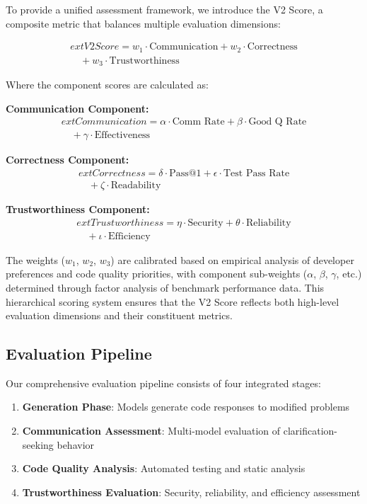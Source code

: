 \documentclass[conference]{IEEEtran}
\begin{document}
To provide a unified assessment framework, we introduce the V2 Score, a composite metric that balances multiple evaluation dimensions:

\begin{multline}
        ext{V2 Score} = w_1 \cdot \text{Communication} + w_2 \cdot \text{Correctness} \\
\quad + w_3 \cdot \text{Trustworthiness}
\end{multline}

Where the component scores are calculated as:

\textbf{Communication Component:}
\begin{multline}
        ext{Communication} = \alpha \cdot \text{Comm Rate} + \beta \cdot \text{Good Q Rate} \\
\quad + \gamma \cdot \text{Effectiveness}
\end{multline}

\textbf{Correctness Component:}
\begin{multline}
        ext{Correctness} = \delta \cdot \text{Pass@1} + \epsilon \cdot \text{Test Pass Rate} \\
\quad + \zeta \cdot \text{Readability}
\end{multline}

\textbf{Trustworthiness Component:}
\begin{multline}
        ext{Trustworthiness} = \eta \cdot \text{Security} + \theta \cdot \text{Reliability} \\
\quad + \iota \cdot \text{Efficiency}
\end{multline}

The weights ($w_1$, $w_2$, $w_3$) are calibrated based on empirical analysis of developer preferences and code quality priorities, with component sub-weights ($\alpha$, $\beta$, $\gamma$, etc.) determined through factor analysis of benchmark performance data. This hierarchical scoring system ensures that the V2 Score reflects both high-level evaluation dimensions and their constituent metrics.

\subsection{Evaluation Pipeline}

Our comprehensive evaluation pipeline consists of four integrated stages:

\begin{enumerate}
    \item \textbf{Generation Phase}: Models generate code responses to modified problems
    \item \textbf{Communication Assessment}: Multi-model evaluation of clarification-seeking behavior
    \item \textbf{Code Quality Analysis}: Automated testing and static analysis
    \item \textbf{Trustworthiness Evaluation}: Security, reliability, and efficiency assessment
\end{enumerate}
\end{document}

